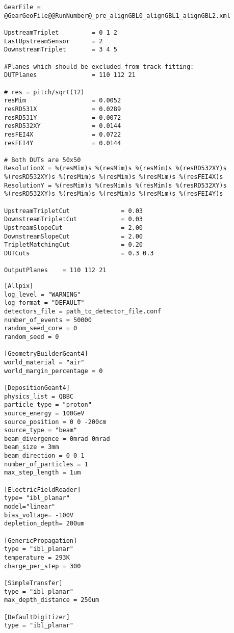 \begin{lstlisting}[caption={Configuration file of EUTelescope for the testbeam anaylsis of June 2020 Batch 3}]
GearFile = @GearGeoFile@@RunNumber@_pre_alignGBL0_alignGBL1_alignGBL2.xml

UpstreamTriplet         = 0 1 2
LastUpstreamSensor      = 2
DownstreamTriplet       = 3 4 5

#Planes which should be excluded from track fitting:
DUTPlanes               = 110 112 21

# res = pitch/sqrt(12)
resMim                  = 0.0052
resRD531X               = 0.0289
resRD531Y               = 0.0072
resRD532XY              = 0.0144
resFEI4X                = 0.0722
resFEI4Y                = 0.0144

# Both DUTs are 50x50
ResolutionX = %(resMim)s %(resMim)s %(resMim)s %(resRD532XY)s
%(resRD532XY)s %(resMim)s %(resMim)s %(resMim)s %(resFEI4X)s
ResolutionY = %(resMim)s %(resMim)s %(resMim)s %(resRD532XY)s
%(resRD532XY)s %(resMim)s %(resMim)s %(resMim)s %(resFEI4Y)s

UpstreamTripletCut              = 0.03
DownstreamTripletCut            = 0.03
UpstreamSlopeCut                = 2.00
DownstreamSlopeCut              = 2.00
TripletMatchingCut              = 0.20
DUTCuts                         = 0.3 0.3

OutputPlanes    = 110 112 21
\end{lstlisting}

\begin{lstlisting}[caption={Allpix$^2$ simulation for 50000 protons with an energy of $\SI{100}{\giga\eV}$}]
[Allpix]
log_level = "WARNING"
log_format = "DEFAULT"
detectors_file = path_to_detector_file.conf
number_of_events = 50000
random_seed_core = 0
random_seed = 0

[GeometryBuilderGeant4]
world_material = "air"
world_margin_percentage = 0

[DepositionGeant4]
physics_list = QBBC
particle_type = "proton"
source_energy = 100GeV
source_position = 0 0 -200cm
source_type = "beam"
beam_divergence = 0mrad 0mrad
beam_size = 3mm
beam_direction = 0 0 1
number_of_particles = 1
max_step_length = 1um

[ElectricFieldReader]
type= "ibl_planar"
model="linear"
bias_voltage= -100V
depletion_depth= 200um

[GenericPropagation]
type = "ibl_planar"
temperature = 293K
charge_per_step = 300

[SimpleTransfer]
type = "ibl_planar"
max_depth_distance = 250um

[DefaultDigitizer]
type = "ibl_planar"
\end{lstlisting}

